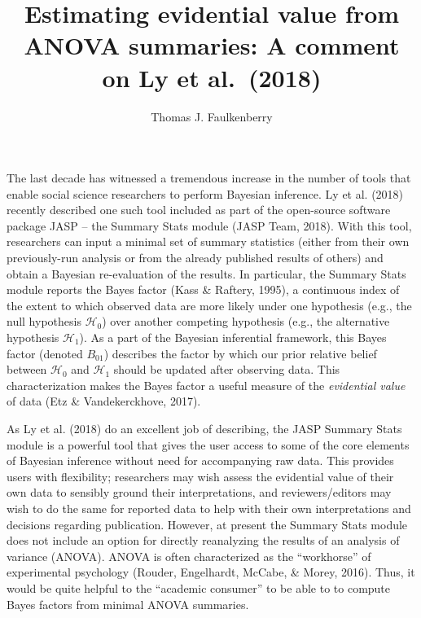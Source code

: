 \documentclass[doc]{apa6}
\title{Estimating evidential value from ANOVA summaries: A comment on Ly et al.~(2018)}
\author{Thomas J. Faulkenberry}
\date{}
\affiliation{Tarleton State University}
\begin{document}
\maketitle

The last decade has witnessed a tremendous increase in the number of tools that enable social science researchers to perform Bayesian inference. Ly et al. (2018) recently described one such tool included as part of the open-source software package JASP -- the Summary Stats module (JASP Team, 2018). With this tool, researchers can input a minimal set of summary statistics (either from their own previously-run analysis or from the already published results of others) and obtain a Bayesian re-evaluation of the results. In particular, the Summary Stats module reports the Bayes factor (Kass \& Raftery, 1995), a continuous index of the extent to which observed data are more likely under one hypothesis (e.g., the null hypothesis \(\mathcal{H}_0\)) over another competing hypothesis (e.g., the alternative hypothesis \(\mathcal{H}_1\)). As a part of the Bayesian inferential framework, this Bayes factor (denoted \(B_{01}\)) describes the factor by which our prior relative belief between \(\mathcal{H}_0\) and \(\mathcal{H}_1\) should be updated after observing data. This characterization makes the Bayes factor a useful measure of the \emph{evidential value} of data (Etz \& Vandekerckhove, 2017).

As Ly et al. (2018) do an excellent job of describing, the JASP Summary Stats module is a powerful tool that gives the user access to some of the core elements of Bayesian inference without need for accompanying raw data. This provides users with flexibility; researchers may wish assess the evidential value of their own data to sensibly ground their interpretations, and reviewers/editors may wish to do the same for reported data to help with their own interpretations and decisions regarding publication. However, at present the Summary Stats module does not include an option for directly reanalyzing the results of an analysis of variance (ANOVA). ANOVA is often characterized as the \enquote{workhorse} of experimental psychology (Rouder, Engelhardt, McCabe, \& Morey, 2016). Thus, it would be quite helpful to the \enquote{academic consumer} to be able to to compute Bayes factors from minimal ANOVA summaries.
\end{document}
